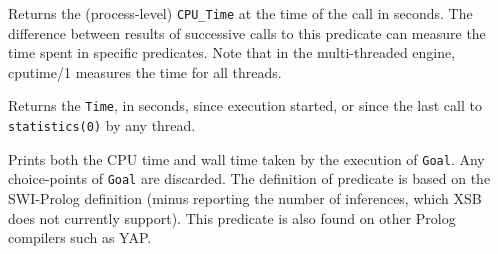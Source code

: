 \begin{description}
{Returns the (process-level) {\tt CPU\_Time} at the time of the call in
seconds.  The difference between results of successive calls to this
predicate can measure the time spent in specific predicates.  Note
that in the multi-threaded engine, {cputime/1} measures the time for
all threads.

%
Returns the \texttt{Time}, in seconds, since execution started, or
since the last call to \texttt{statistics(0)} by any thread.
}

%
Prints both the CPU time and wall time taken by the execution of \texttt{Goal}.
Any choice-points of \texttt{Goal} are discarded. The definition of predicate is based 
on the SWI-Prolog definition (minus reporting the number of inferences, which XSB does 
not currently support). This predicate is also found on other Prolog compilers such as YAP.

\end{description}





